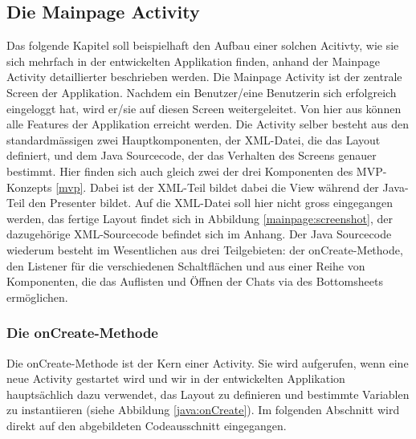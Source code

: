 \documentclass[a4paper,11pt]{report}
\begin{document}
			\subsection{Die Mainpage Activity}
			Das folgende Kapitel soll beispielhaft den Aufbau einer solchen Acitivty, wie sie sich mehrfach in der entwickelten Applikation finden, anhand der Mainpage Activity detaillierter beschrieben werden. Die Mainpage Activity ist der zentrale Screen der Applikation. Nachdem ein Benutzer/eine Benutzerin sich erfolgreich eingeloggt hat, wird er/sie auf diesen Screen weitergeleitet. Von hier aus können alle Features der Applikation erreicht werden. Die Activity selber besteht aus den standardmässigen zwei Hauptkomponenten, der XML-Datei, die das Layout definiert, und dem Java Sourcecode, der das Verhalten des Screens genauer bestimmt. Hier finden sich auch gleich zwei der drei Komponenten des MVP-Konzepts \ref{mvp}. Dabei ist der XML-Teil bildet dabei die View während der Java-Teil den Presenter bildet. Auf die XML-Datei soll hier nicht gross eingegangen werden, das fertige Layout findet sich in Abbildung \ref{mainpage:screenshot}, der dazugehörige XML-Sourcecode befindet sich im Anhang. Der Java Sourcecode wiederum besteht im Wesentlichen aus drei Teilgebieten: der onCreate-Methode, den Listener für die verschiedenen Schaltflächen und aus einer Reihe von Komponenten, die das Auflisten und Öffnen der Chats via des Bottomsheets ermöglichen.
			
			\subsubsection{Die onCreate-Methode}
			Die onCreate-Methode ist der Kern einer Activity. Sie wird aufgerufen, wenn eine neue Activity gestartet wird und wir in der entwickelten Applikation hauptsächlich dazu verwendet, das Layout zu definieren und bestimmte Variablen zu instantiieren (siehe Abbildung \ref{java:onCreate}). Im folgenden Abschnitt wird direkt auf den abgebildeten Codeausschnitt eingegangen.
			
\end{document}
